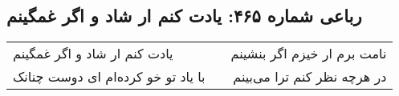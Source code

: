 \begin{center}
\section*{رباعی شماره ۴۶۵: یادت کنم ار شاد و اگر غمگینم}
\label{sec:sh465}
\begin{longtable}{l p{0.5cm} r}
یادت کنم ار شاد و اگر غمگینم
&&
نامت برم ار خیزم اگر بنشینم
\\
با یاد تو خو کرده‌ام ای دوست چنانک
&&
در هرچه نظر کنم ترا می‌بینم
\\
\end{longtable}
\end{center}
